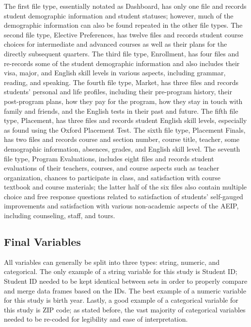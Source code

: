 \documentclass[12pt,letterpaper]{article}
\begin{document}
The first file type, essentially notated as Dashboard, has only one file and records student demographic information and student statuses; however, much of the demographic information can also be found repeated in the other file types. The second file type, Elective Preferences, has twelve files and records student course choices for intermediate and advanced courses as well as their plans for the directly subsequent quarters. The third file type, Enrollment, has four files and re-records some of the student demographic information and also includes their visa, major, and English skill levels in various aspects, including grammar, reading, and speaking. The fourth file type, Market, has three files and records students’ personal and life profiles, including their pre-program history, their post-program plans, how they pay for the program, how they stay in touch with family and friends, and the English tests in their past and future. The fifth file type, Placement, has three files and records student English skill levels, especially as found using the Oxford Placement Test. The sixth file type, Placement Finals, has two files and records course and section number, course title, teacher, some demographic information, absences, grades, and English skill level. The seventh file type, Program Evaluations, includes eight files and records student evaluations of their teachers, courses, and course aspects such as teacher organization, chances to participate in class, and satisfaction with course textbook and course materials; the latter half of the six files also contain multiple choice and free response questions related to satisfaction of students’ self-gauged improvements and satisfaction with various non-academic aspects of the AEIP, including counseling, staff, and tours.

\subsection{Final Variables}

All variables can generally be split into three types: string, numeric, and categorical. The only example of a string variable for this study is Student ID; Student ID needed to be kept identical between sets in order to properly compare and merge data frames based on the IDs. The best example of a numeric variable for this study is birth year. Lastly, a good example of a categorical variable for this study is ZIP code; as stated before, the vast majority of categorical variables needed to be re-coded for legibility and ease of interpretation.
\end{document}
